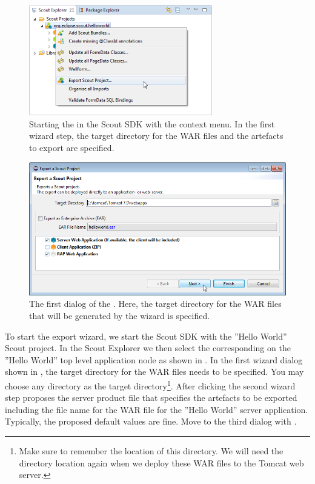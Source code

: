 \documentclass[a4paper,10pt,twoside]{book}
\begin{document}
\begin{figure}
\includegraphics[width=8cm]{sdk_export_war_menu.png} 
\caption{Starting the  in the Scout SDK with the context menu. 
In the first wizard step, the target directory for the WAR files and the artefacts to export are specified.}
\end{figure}

\begin{figure}
\includegraphics[width=12cm]{export_wizard_1.png}
\caption{The first dialog of the . 
Here, the target directory for the WAR files that will be generated by the wizard is specified.}
\end{figure}

To start the export wizard, we start the Scout SDK with the ''Hello World'' Scout project.
In the Scout Explorer we then select the corresponding  on the ''Hello World'' top level application node as shown in .
In the first wizard dialog shown in , the target directory for the WAR files needs to be specified.
You may choose any directory as the target directory\footnote{
Make sure to remember the location of this directory.
We will need the directory location again when we deploy these WAR files to the Tomcat web server.
}.
After clicking  the second wizard step proposes the server product file that specifies the artefacts to be exported including the file name for the WAR file for the ''Hello World'' server application.
Typically, the proposed default values are fine.
Move to the third dialog with .
\end{document}
